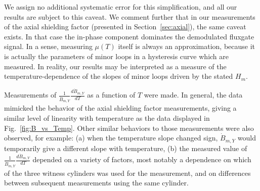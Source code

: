 We assign no additional systematic error for this simplification, and
all our results are subject to this caveat.  We comment further that
in our measurements of the axial shielding factor (presented in
Section~\ref{sec:axial}), the same caveat exists.  In that case the
in-phase component dominates the demodulated fluxgate signal.  In a
sense, measuring $\mu(T)$ itself is always an approximation, because
it is actually the parameters of minor loops in a hysteresis curve
which are measured.  In reality, our results may be interpreted as a
measure of the temperature-dependence of the slopes of minor loops
driven by the stated $H_m$.

Measurements of $\frac{1}{\dot{B}_{m,Y}}\frac{d\dot{B}_{m,Y}}{dT}$ as
a function of $T$ were made.  In general, the data mimicked the
behavior of the axial shielding factor measurements, giving a similar
level of linearity with temperature as the data displayed in
Fig.~\ref{fig:B_vs_Temp}.  Other similar behaviors to those
measurements were also observed, for example: (a) when the temperature
slope changed sign, $\dot{B}_{m,Y}$ would temporarily give a different
slope with temperature, (b) the measured value of
$\frac{1}{\dot{B}_{m,Y}}\frac{d\dot{B}_{m,Y}}{dT}$ depended on a
variety of factors, most notably a dependence on which of the three
witness cylinders was used for the measurement, and on differences
between subsequent measurements using the same cylinder.

